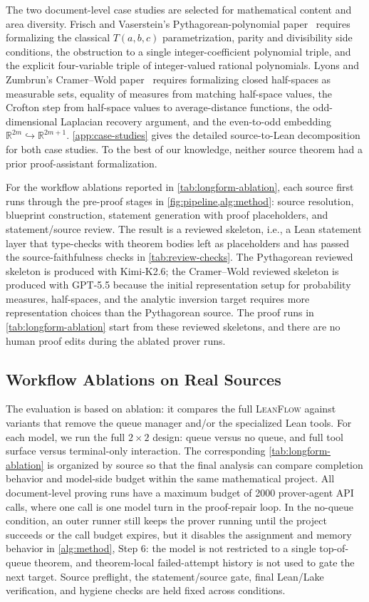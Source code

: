 \documentclass{article}
\newcommand{\method}{\textsc{LeanFlow}\xspace}
\newcommand{\kimi}{Kimi-K2.6\xspace}
\newcommand{\gpt}{GPT-5.5\xspace}
\newcommand{\lean}{Lean\xspace}
\begin{document}
The two document-level case studies are selected for mathematical content and area diversity.
Frisch and Vaserstein's Pythagorean-polynomial paper~\citep{frisch2007pythagorean} requires formalizing the classical $T(a,b,c)$ parametrization, parity and divisibility side conditions, the obstruction to a single integer-coefficient polynomial triple, and the explicit four-variable triple of integer-valued rational polynomials.
Lyons and Zumbrun's Cramer--Wold paper~\citep{lyons2017cramerwold} requires formalizing closed half-spaces as measurable sets, equality of measures from matching half-space values, the Crofton step from half-space values to average-distance functions, the odd-dimensional Laplacian recovery argument, and the even-to-odd embedding $\mathbb{R}^{2m}\hookrightarrow\mathbb{R}^{2m+1}$.
\cref{app:case-studies} gives the detailed source-to-\lean decomposition for both case studies.
To the best of our knowledge, neither source theorem had a prior proof-assistant formalization.

For the workflow ablations reported in \cref{tab:longform-ablation}, each source first runs through the pre-proof stages in \cref{fig:pipeline,alg:method}: source resolution, blueprint construction, statement generation with proof placeholders, and statement/source review.
The result is a reviewed skeleton, i.e., a \lean statement layer that type-checks with theorem bodies left as placeholders and has passed the source-faithfulness checks in \cref{tab:review-checks}.
The Pythagorean reviewed skeleton is produced with \kimi; the Cramer--Wold reviewed skeleton is produced with \gpt because the initial representation setup for probability measures, half-spaces, and the analytic inversion target requires more representation choices than the Pythagorean source.
The proof runs in \cref{tab:longform-ablation} start from these reviewed skeletons, and there are no human proof edits during the ablated prover runs.

\subsection{Workflow Ablations on Real Sources}

The evaluation is based on ablation: it compares the full \method against variants that remove the queue manager and/or the specialized \lean tools.
For each model, we run the full $2\times2$ design: queue versus no queue, and full tool surface versus terminal-only interaction. The corresponding \cref{tab:longform-ablation} is organized by source so that the final analysis can compare completion behavior and model-side budget within the same mathematical project.
All document-level proving runs have a maximum budget of 2000 prover-agent API calls, where one call is one model turn in the proof-repair loop.
In the no-queue condition, an outer runner still keeps the prover running until the project succeeds or the call budget expires, but it disables the assignment and memory behavior in \cref{alg:method}, Step 6: the model is not restricted to a single top-of-queue theorem, and theorem-local failed-attempt history is not used to gate the next target.
Source preflight, the statement/source gate, final \lean/Lake verification, and hygiene checks are held fixed across conditions.
\end{document}
